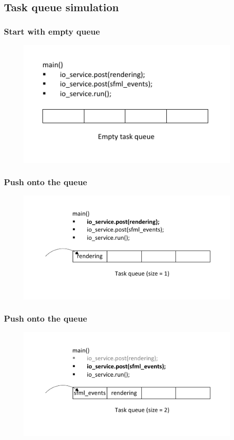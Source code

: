 \documentclass[xcolor=dvipsnames]{beamer}
\begin{document}
\subsection{Task queue simulation}
\begin{frame}
\frametitle{Start with empty queue}
\begin{figure}[p]
  \centering
  \includegraphics{images/queue-frame1.pdf}
\end{figure}
\end{frame}

\begin{frame}
\frametitle{Push onto the queue}
\begin{figure}[p]
  \centering
  \includegraphics{images/queue-frame2.pdf}
\end{figure}
\end{frame}

\begin{frame}
\frametitle{Push onto the queue}
\begin{figure}[p]
  \centering
  \includegraphics{images/queue-frame3.pdf}
\end{figure}
\end{frame}
\end{document}

